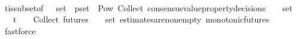 \begin{isabellebody}
\ \ \ \ \isamarkupfalse%
\ {\isasymSigma}t{\isacharunderscore}is{\isacharunderscore}subset{\isacharunderscore}of{\isacharunderscore}{\isasymSigma}\ {\isacartoucheopen}{\isasymsigma}\ {\isasymin}\ {\isasymsigma}{\isacharunderscore}set\ {\isasymand}\ p{\isacharunderscore}set\ {\isasymin}\ Pow\ {\isacharparenleft}{\isasymUnion}{\isacharunderscore}Collect\ {\isacharparenleft}consensus{\isacharunderscore}value{\isacharunderscore}property{\isacharunderscore}decisions\ {\isasymsigma}{\isacharprime}{\isacharparenright}\ {\isacharparenleft}{\isasymsigma}{\isacharprime}\ {\isasymin}\ {\isasymsigma}{\isacharunderscore}set{\isacharparenright}{\isacharparenright}\ {\isacharminus}\ {\isacharbraceleft}{\isasymemptyset}{\isacharbraceright}{\isacartoucheclose}\ {\isacartoucheopen}{\isasymsigma}{\isacharprime}\ {\isasymin}\ {\isasymSigma}t\ {\isasymand}\ {\isasymsigma}{\isacharprime}\ {\isasymin}\ {\isasymInter}{\isacharunderscore}Collect\ {\isacharparenleft}futures\ {\isasymsigma}{\isacharparenright}\ {\isacharparenleft}{\isasymsigma}\ {\isasymin}\ {\isasymsigma}{\isacharunderscore}set{\isacharparenright}{\isacartoucheclose}\ estimates{\isacharunderscore}are{\isacharunderscore}non{\isacharunderscore}empty\ monotonic{\isacharunderscore}futures\ \isamarkupfalse%
\ fastforce\isanewline
{}\isamarkupfalse%
%
\endisatagproof
{\isafoldproof}%
%
\isadelimproof
\isanewline
%
\endisadelimproof
%
\isadelimtheory
\isanewline
%
\endisadelimtheory
%
\isatagtheory
{}\isamarkupfalse%
%
\endisatagtheory
{\isafoldtheory}%
%
\isadelimtheory
%
\endisadelimtheory
%
\end{isabellebody}%
\endinput
